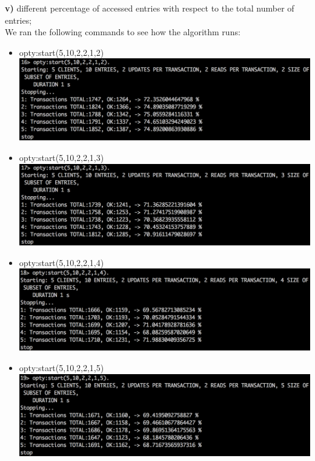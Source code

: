 \documentclass[a4paper, 11pt]{article}
\begin{document}
%
\newpage
\textbf{v)} different percentage of accessed entries with respect to the total number of entries;\\
We ran the following commands to see how the algorithm runs:\\
\begin{itemize}
\item opty:start(5,10,2,2,1,2)\\
\includegraphics[scale=0.5]{images/exp-v-1.png} \\
\item opty:start(5,10,2,2,1,3)\\
\includegraphics[scale=0.5]{images/exp-v-2.png} \\
\item opty:start(5,10,2,2,1,4)\\
\includegraphics[scale=0.5]{images/exp-v-3.png} \\
\item opty:start(5,10,2,2,1,5)\\
\includegraphics[scale=0.5]{images/exp-v-4.png} \\

\end{itemize}
\end{document}
